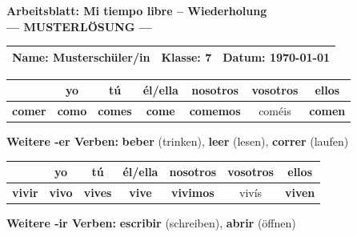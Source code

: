 \documentclass[11pt, a4paper]{article}
\newcommand{\fachfarbe}{spanisch}
\newcommand{\thema}{Mi tiempo libre}
\newcommand{\klasse}{7}
\newcommand{\datum}{\today}
\newcommand{\lsg}[1]{\textcolor{loesung}{\textbf{#1}}}
\newcommand{\es}[1]{\textcolor{\fachfarbe}{\textbf{#1}}}
\begin{document}
\begin{center}
    {\Large\bfseries\textcolor{\fachfarbe}{Arbeitsblatt: \thema{} -- Wiederholung}}\\[0.3em]
    {\large\textcolor{loesung}{\textbf{--- MUSTERLÖSUNG ---}}}
\end{center}

\vspace{5pt}

\noindent
\begin{tabularx}{\textwidth}{|X|X|X|}
\hline
\textbf{Name:} \lsg{Musterschüler/in} &
\textbf{Klasse:} \klasse &
\textbf{Datum:} \datum \\
\hline
\end{tabularx}

\vspace{15pt}


\begin{merkkasten}

\begin{tabular}{l|cccccc}
& \textbf{yo} & \textbf{tú} & \textbf{él/ella} & \textbf{nosotros} & \textbf{vosotros} & \textbf{ellos} \\
\hline
\es{comer} & \lsg{como} & \lsg{comes} & \lsg{come} & \lsg{comemos} & coméis & \lsg{comen} \\
\end{tabular}

\vspace{0.5em}
\textbf{Weitere -er Verben:} \es{beber} (trinken), \es{leer} (lesen), \es{correr} (laufen)

\end{merkkasten}

\vspace{10pt}


\begin{merkkasten}

\begin{tabular}{l|cccccc}
& \textbf{yo} & \textbf{tú} & \textbf{él/ella} & \textbf{nosotros} & \textbf{vosotros} & \textbf{ellos} \\
\hline
\es{vivir} & \lsg{vivo} & \lsg{vives} & \lsg{vive} & \lsg{vivimos} & vivís & \lsg{viven} \\
\end{tabular}

\vspace{0.5em}
\textbf{Weitere -ir Verben:} \es{escribir} (schreiben), \es{abrir} (öffnen)

\end{merkkasten}
\end{document}
